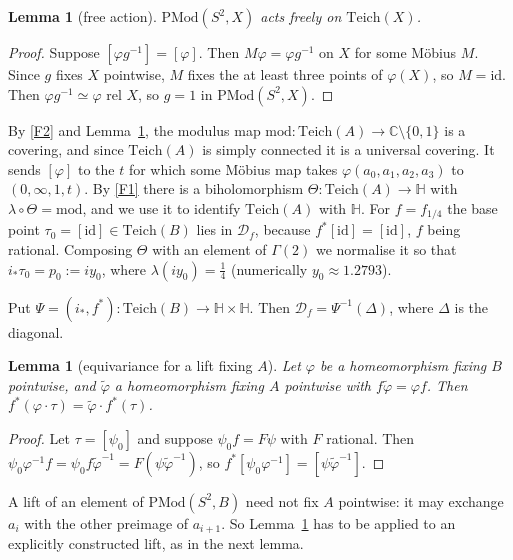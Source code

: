 \documentclass[11pt]{article}
\newtheorem{lemma}[proposition]{Lemma}
\theoremstyle{definition}
\newcommand{\Teich}{\mathrm{Teich}}
\newcommand{\PMod}{\mathrm{PMod}}
\newcommand{\HH}{\mathbb H}
\newcommand{\D}{\mathcal D}
\begin{document}
\begin{lemma}[free action]\label{lem:free}
$\PMod(S^2,X)$ acts freely on $\Teich(X)$.
\end{lemma}

\begin{proof}
Suppose $[\varphi g^{-1}]=[\varphi]$. Then $M\varphi=\varphi g^{-1}$ on $X$ for some M\"obius $M$. Since $g$ fixes $X$ pointwise, $M$ fixes the at least three points of $\varphi(X)$, so $M=\mathrm{id}$. Then $\varphi g^{-1}\simeq\varphi$ rel $X$, so $g=1$ in $\PMod(S^2,X)$.
\end{proof}

By \ref{F2} and Lemma~\ref{lem:free}, the modulus map $\mathrm{mod}\colon\Teich(A)\to\mathbb C\setminus\{0,1\}$ is a covering, and since $\Teich(A)$ is simply connected it is a universal covering. It sends $[\varphi]$ to the $t$ for which some M\"obius map takes $\varphi(a_0,a_1,a_2,a_3)$ to $(0,\infty,1,t)$. By \ref{F1} there is a biholomorphism $\Theta\colon\Teich(A)\to\HH$ with $\lambda\circ\Theta=\mathrm{mod}$, and we use it to identify $\Teich(A)$ with $\HH$. For $f=f_{1/4}$ the base point $\tau_0=[\mathrm{id}]\in\Teich(B)$ lies in $\D_f$, because $f^*[\mathrm{id}]=[\mathrm{id}]$, $f$ being rational. Composing $\Theta$ with an element of $\Gamma(2)$ we normalise it so that $i_*\tau_0=p_0:=iy_0$, where $\lambda(iy_0)=\tfrac14$ (numerically $y_0\approx1.2793$).

Put $\Psi=(i_*,f^*)\colon\Teich(B)\to\HH\times\HH$. Then $\D_f=\Psi^{-1}(\Delta)$, where $\Delta$ is the diagonal.

\begin{lemma}[equivariance for a lift fixing $A$]\label{lem:equiv}
Let $\varphi$ be a homeomorphism fixing $B$ pointwise, and $\tilde\varphi$ a homeomorphism fixing $A$ pointwise with $f\tilde\varphi=\varphi f$. Then $f^*(\varphi\cdot\tau)=\tilde\varphi\cdot f^*(\tau)$.
\end{lemma}

\begin{proof}
Let $\tau=[\psi_0]$ and suppose $\psi_0 f=F\psi$ with $F$ rational. Then $\psi_0\varphi^{-1}f=\psi_0 f\tilde\varphi^{-1}=F(\psi\tilde\varphi^{-1})$, so $f^*[\psi_0\varphi^{-1}]=[\psi\tilde\varphi^{-1}]$.
\end{proof}

A lift of an element of $\PMod(S^2,B)$ need not fix $A$ pointwise: it may exchange $a_i$ with the other preimage of $a_{i+1}$. So Lemma~\ref{lem:equiv} has to be applied to an explicitly constructed lift, as in the next lemma.
\end{document}
